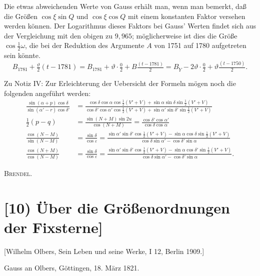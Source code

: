 \documentclass[12pt,a4paper]{article}
\theoremstyle{plain}
\theoremstyle{definition}
\theoremstyle{remark}
\begin{document}
Die etwas abweichenden Werte von Gauss erh\"alt man, wenn man bemerkt, da\ss{} die Gr\"o\ss en $\cos\xi\sin Q$ und $\cos\xi\cos Q$ mit einem konstanten Faktor versehen werden k\"onnen. Der Logarithmus dieses Faktors bei Gauss' Werten findet sich aus der Vergleichung mit den obigen zu $9{,}965$; m\"oglicherweise ist dies die Gr\"o\ss e $\cos\tfrac{1}{2}\omega$, die bei der Reduktion des Argumente $A$ von 1751 auf 1780 aufgetreten sein k\"onnte.
\[
B_{1781} + \tfrac{\vartheta}{2}(t - 1781) = B_{1781} + \vartheta\cdot\tfrac{0}{2} + B\tfrac{(t - 1781)}{2} = B_{\ddot{Y}} - 2\vartheta\cdot\tfrac{0}{2} + \vartheta\tfrac{(t - 1750)}{2}.
\]

Zu Notiz IV: Zur Erleichterung der Uebersicht der Formeln m\"ogen noch die folgenden angef\"uhrt werden:
\begin{align*}
\tfrac{\sin(\alpha + p)\cos\delta}{\sin(\alpha' - r)\cos\delta'} &= \tfrac{\cos\delta\cos\alpha\cos\tfrac{1}{2}(V' + V) + \sin\alpha\sin\delta\sin\tfrac{1}{2}(V' + V)}{\cos\delta'\cos\alpha'\cos\tfrac{1}{2}(V' + V) + \sin\alpha'\sin\delta'\sin\tfrac{1}{2}(V' + V)} \\
\tfrac{1}{2}(p - q) &= \tfrac{\sin(N + M)\sin 2u}{\cos(N + M)} = \tfrac{\cos\delta'\cos\alpha'}{\cos\delta\cos\alpha} \\
\tfrac{\cos(N - M)}{\sin(N - M)} &= \tfrac{\sin\delta}{\cos\varepsilon} = \tfrac{\sin\alpha'\sin\delta'\cos\tfrac{1}{2}(V' + V) - \sin\alpha\cos\delta\sin\tfrac{1}{2}(V' + V)}{\cos\delta\sin\alpha' - \cos\delta'\sin\alpha} \\
\tfrac{\cos(N + M)}{\cos(N - M)} &= \tfrac{\sin\delta}{\cos\varepsilon} = \tfrac{\sin\alpha'\sin\delta'\cos\tfrac{1}{2}(V' + V) - \sin\alpha\cos\delta'\sin\tfrac{1}{2}(V' + V)}{\cos\delta\sin\alpha' - \cos\delta'\sin\alpha}.
\end{align*}

\hfill\textsc{Brendel}.

\newpage

\section*{[10) \"Uber die Gr\"o\ss enordnungen der Fixsterne]}

[Wilhelm Olbers, Sein Leben und seine Werke, I 12, Berlin 1909.]

Gauss an Olbers, G\"ottingen, 18. M\"arz 1821.
\end{document}

